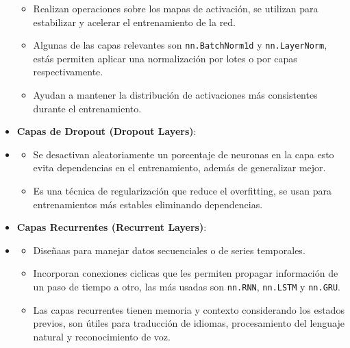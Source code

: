 \begin{itemize}
        \begin{itemize}
            \item Realizan operaciones sobre los mapas de activación, se utilizan para estabilizar y acelerar el entrenamiento de la red.
            \item Algunas de las capas relevantes son \texttt{nn.BatchNorm1d} y \texttt{nn.LayerNorm}, estás permiten aplicar una normalización por lotes o por capas respectivamente.
            \item Ayudan a mantener la distribución de activaciones más consistentes durante el entrenamiento.
        \end{itemize}
    \item \textbf{Capas de Dropout (Dropout Layers)}:
    \item[]
        \begin{itemize}
            \item Se desactivan aleatoriamente un porcentaje de neuronas en la capa esto evita dependencias en el entrenamiento, además de generalizar mejor.
            \item Es una técnica de regularización que reduce el {overfitting}, se usan para entrenamientos más estables eliminando dependencias.
        \end{itemize}
    \item \textbf{Capas Recurrentes (Recurrent Layers)}:
    \item[]
        \begin{itemize}
            \item Diseñaas para manejar datos secuenciales o de series temporales.
            \item Incorporan conexiones ciclicas que les permiten propagar información de un paso de tiempo a otro, las más usadas son \texttt{nn.RNN}, \texttt{nn.LSTM} y \texttt{nn.GRU}.
            \item Las capas recurrentes tienen memoria y contexto considerando los estados previos, son útiles para traducción de idiomas, procesamiento del lenguaje natural y reconocimiento de voz.
        \end{itemize}
\end{itemize}

